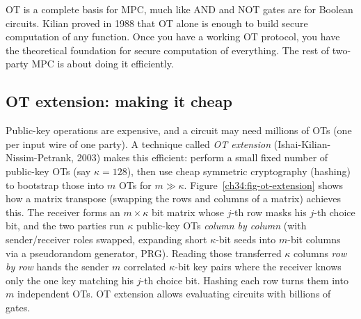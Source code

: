 \begin{focusbox}
OT is a complete basis for MPC, much like AND and NOT gates are for Boolean circuits. Kilian proved in 1988 that OT alone is enough to build secure computation of any function. Once you have a working OT protocol, you have the theoretical foundation for secure computation of everything. The rest of two-party MPC is about doing it efficiently.
\end{focusbox}

\subsection{OT extension: making it cheap}

Public-key operations are expensive, and a circuit may need millions of OTs (one per input wire of one party). A technique called \emph{OT extension} (Ishai-Kilian-Nissim-Petrank, 2003) makes this efficient: perform a small fixed number of public-key OTs (say $\kappa = 128$), then use cheap symmetric cryptography (hashing) to bootstrap those into $m$ OTs for $m \gg \kappa$. Figure~\ref{ch34:fig-ot-extension} shows how a matrix transpose (swapping the rows and columns of a matrix) achieves this. The receiver forms an $m \times \kappa$ bit matrix whose $j$-th row masks his $j$-th choice bit, and the two parties run $\kappa$ public-key OTs \emph{column by column} (with sender/receiver roles swapped, expanding short $\kappa$-bit seeds into $m$-bit columns via a pseudorandom generator, PRG). Reading those transferred $\kappa$ columns \emph{row by row} hands the sender $m$ correlated $\kappa$-bit key pairs where the receiver knows only the one key matching his $j$-th choice bit. Hashing each row turns them into $m$ independent OTs. OT extension allows evaluating circuits with billions of gates.

